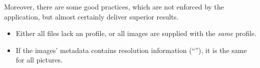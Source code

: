 Moreover, there are some good practices, which are not enforced by the application, but almost
certainly deliver superior results.

\begin{itemize}
\item
  Either all files lack an  profile, or all images are supplied with the
  \emph{same}  profile.

\item
  If the images' metadata contains resolution information (``''), it is the same
  for all pictures.
\end{itemize}


